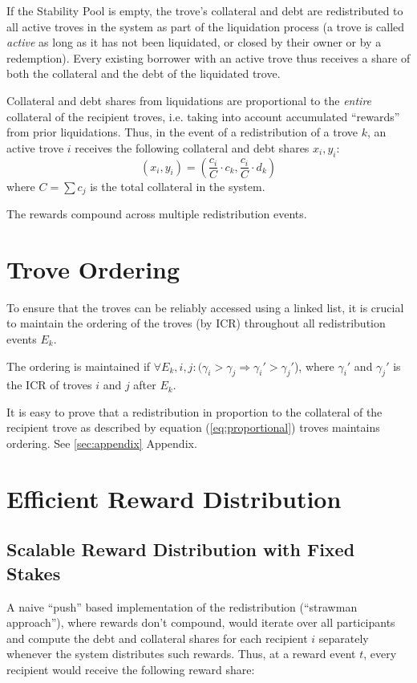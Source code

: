 \documentclass[reqno]{article}
\begin{document}
If the Stability Pool is empty, the trove's collateral and debt are redistributed to all active troves in the system as part of the liquidation process (a trove is called \textit{active} as long as it has not been liquidated, or closed by their owner or by a redemption). Every existing borrower with an active trove thus receives a share of both the collateral and the debt of the liquidated trove.

Collateral and debt shares from liquidations are proportional to the \textit{entire} collateral of the recipient troves, i.e. taking into account accumulated “rewards” from prior liquidations. Thus, in the event of a redistribution of a trove $k$, an active trove $i$ receives the following collateral and debt shares $x_i,y_i$:  
\begin{equation} \label{eq:proportional}
  (x_i, y_i) = \left(\frac{c_i}{C} \cdot c_k, \frac{c_i}{C} \cdot d_k\right)
\end{equation}
where $C=\sum c_j$ is the total collateral in the system.

The rewards compound across multiple redistribution events.

\section{Trove Ordering}
To ensure that the troves can be reliably accessed using a linked list, it is crucial to maintain the ordering of the troves (by ICR) throughout all redistribution events $E_k$.

The ordering is maintained if $\forall{E_k,i,j}: (\gamma_i > \gamma_j	\Longrightarrow \gamma_i' > \gamma_j'$), where $\gamma_i'$ and $\gamma_j'$ is the ICR of troves $i$ and $j$ after $E_k$.

It is easy to prove that a redistribution in proportion to the collateral of the recipient trove as described by equation (\ref{eq:proportional}) troves maintains ordering. See \ref{sec:appendix} Appendix.

\section{Efficient Reward Distribution}

\subsection{Scalable Reward Distribution with Fixed Stakes} \label{sec:strawman}

A naive “push” based implementation of the redistribution (“strawman approach”), where rewards don’t compound, would iterate over all participants and compute the debt and collateral shares  for each recipient $i$ separately whenever the system distributes such rewards. Thus, at a reward event $t$, every recipient would receive the following reward share:
\end{document}
